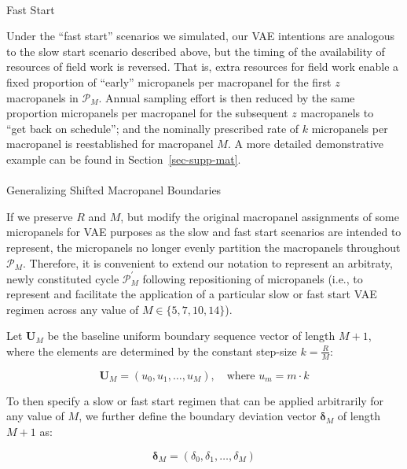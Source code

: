 \documentclass[
  number]{elsarticle}
\makeatletter
\let\oldparagraph\paragraph
\renewcommand{\paragraph}{
    \@ifstar
      \xxxParagraphStar
      \xxxParagraphNoStar
  }
\newcommand{\xxxParagraphStar}[1]{\oldparagraph*{#1}\mbox{}}
\newcommand{\xxxParagraphNoStar}[1]{\oldparagraph{#1}\mbox{}}
\makeatother
\begin{document}
\paragraph{Fast Start}\label{fast-start}

Under the ``fast start'' scenarios we simulated, our VAE intentions are
analogous to the slow start scenario described above, but the timing of
the availability of resources of field work is reversed. That is, extra
resources for field work enable a fixed proportion of ``early''
micropanels per macropanel for the first \(z\) macropanels in
\(\mathcal{P}_M\). Annual sampling effort is then reduced by the same
proportion micropanels per macropanel for the subsequent \(z\)
macropanels to\\
``get back on schedule''; and the nominally prescribed rate of \(k\)
micropanels per macropanel is reestablished for macropanel \(M\). A more
detailed demonstrative example can be found in
Section~\ref{sec-supp-mat}.

\paragraph{Generalizing Shifted Macropanel
Boundaries}\label{generalizing-shifted-macropanel-boundaries}

If we preserve \(R\) and \(M\), but modify the original macropanel
assignments of some micropanels for VAE purposes as the slow and fast
start scenarios are intended to represent, the micropanels no longer
evenly partition the macropanels throughout \(\mathcal{P}_M\).
Therefore, it is convenient to extend our notation to represent an
arbitraty, newly constituted cycle \(\mathcal{P}^\prime_M\) following
repositioning of micropanels (i.e., to represent and facilitate the
application of a particular slow or fast start VAE regimen across any
value of \(M \in \{5, 7, 10, 14\}\)).

Let \(\mathbf{U}_M\) be the baseline uniform boundary sequence vector of
length \(M+1\), where the elements are determined by the constant
step-size \(k = \frac{R}{M}\):

\[\mathbf{U}_M = (u_0, u_1, \dots, u_M), \quad \text{where } u_m = m \cdot k\]

To then specify a slow or fast start regimen that can be applied
arbitrarily for any value of \(M\), we further define the boundary
deviation vector \(\boldsymbol{\delta}_M\) of length \(M+1\) as:

\[\boldsymbol{\delta}_M = (\delta_0, \delta_1, \ldots, \delta_M)\]
\end{document}
